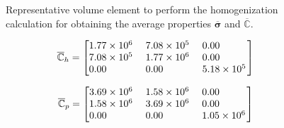 \documentclass[review]{elsarticle}
\begin{document}
\begin{figure}[!ht]
\centering
{}
\caption{Representative volume element to perform the homogenization calculation for obtaining the 
average properties $\overline{\bm{\sigma}}$ and $\overline{\mathbb{C}}$.}
\label{fig_rve_front_fib}
\end{figure}

\begin{equation}
\overline{\mathbb{C}}_h = 
  \begin{bmatrix}
   \begin{tabular}{ @{}*{3}{S[round-mode=places,
                    round-integer-to-decimal,round-precision=2,
                    table-format=1.2e4,table-column-width=16mm,table-number-alignment=center]}@{}
		  }
    1.7722e+06 & 7.08e+05 & 0.0\\
    7.08e+05 & 1.77e+06 & 0.0\\
    0.0          & 0.0  & 5.18e+05
   \end{tabular}
  \end{bmatrix}
\end{equation}

\begin{equation}
\overline{\mathbb{C}}_p = 
  \begin{bmatrix}
   \begin{tabular}{ @{}*{3}{S[round-mode=places,
                    round-integer-to-decimal,round-precision=2,
                    table-format=1.2e4,table-column-width=16mm,table-number-alignment=center]}@{}
		  }
    3.691352e+06 & 1.582008e+06 & 0.0\\
    1.582008e+06 & 3.691352e+06 & 0.0\\
    0.0          & 0.0          & 1.054672e+06
   \end{tabular}
  \end{bmatrix}
\end{equation}
\end{document}

